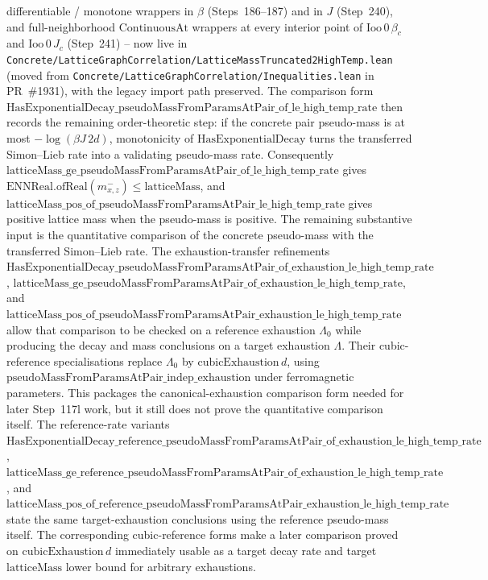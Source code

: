 \documentclass[a4paper,11pt]{article}
\begin{document}
differentiable / monotone wrappers in $\beta$ (Steps~186--187) and in $J$
(Step~240), and full-neighborhood $\mathrm{ContinuousAt}$ wrappers at every
interior point of $\mathrm{Ioo}\,0\,\beta_c$ and $\mathrm{Ioo}\,0\,J_c$
(Step~241) -- now live in
\texttt{Concrete/LatticeGraphCorrelation/LatticeMassTruncated2HighTemp.lean}
(moved from \texttt{Concrete/LatticeGraphCorrelation/Inequalities.lean}
in PR~\#1931), with the legacy import path preserved.
The comparison form
$\mathrm{HasExponentialDecay\_pseudoMassFromParamsAtPair\_of\_le\_high\_temp\_rate}$
then records the remaining order-theoretic step: if the concrete pair
pseudo-mass is at most $-\log(\beta J\,2d)$, monotonicity of
$\mathrm{HasExponentialDecay}$ turns the transferred Simon--Lieb rate into a
validating pseudo-mass rate. Consequently
$\mathrm{latticeMass\_ge\_pseudoMassFromParamsAtPair\_of\_le\_high\_temp\_rate}$
gives $\mathrm{ENNReal.ofReal}(m^-_{x,z}) \le \mathrm{latticeMass}$, and
$\mathrm{latticeMass\_pos\_of\_pseudoMassFromParamsAtPair\_le\_high\_temp\_rate}$
gives positive lattice mass when the pseudo-mass is positive. The remaining
substantive input is the quantitative comparison of the concrete pseudo-mass
with the transferred Simon--Lieb rate.
The exhaustion-transfer refinements
$\mathrm{HasExponentialDecay\_pseudoMassFromParamsAtPair\_of\_exhaustion\_le\_high\_temp\_rate}$,
$\mathrm{latticeMass\_ge\_pseudoMassFromParamsAtPair\_of\_exhaustion\_le\_high\_temp\_rate}$,
and
$\mathrm{latticeMass\_pos\_of\_pseudoMassFromParamsAtPair\_exhaustion\_le\_high\_temp\_rate}$
allow that comparison to be checked on a reference exhaustion
$\Lambda_0$ while producing the decay and mass conclusions on a target
exhaustion $\Lambda$.  Their cubic-reference specialisations replace
$\Lambda_0$ by $\mathrm{cubicExhaustion}\,d$, using
$\mathrm{pseudoMassFromParamsAtPair\_indep\_exhaustion}$ under ferromagnetic
parameters.  This packages the canonical-exhaustion comparison form needed for
later Step~117l work, but it still does not prove the quantitative comparison
itself.
The reference-rate variants
$\mathrm{HasExponentialDecay\_reference\_pseudoMassFromParamsAtPair\_of\_exhaustion\_le\_high\_temp\_rate}$,
$\mathrm{latticeMass\_ge\_reference\_pseudoMassFromParamsAtPair\_of\_exhaustion\_le\_high\_temp\_rate}$,
and
$\mathrm{latticeMass\_pos\_of\_reference\_pseudoMassFromParamsAtPair\_exhaustion\_le\_high\_temp\_rate}$
state the same target-exhaustion conclusions using the reference pseudo-mass
itself.  The corresponding cubic-reference forms make a later comparison
proved on $\mathrm{cubicExhaustion}\,d$ immediately usable as a target
decay rate and target $\mathrm{latticeMass}$ lower bound for arbitrary
exhaustions.
\end{document}
